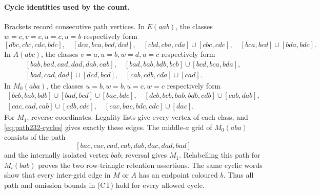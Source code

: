 \paragraph{Cycle identities used by the count.}
Brackets record consecutive path vertices. In $E(aab)$, the classes
$w=c,v=c,u=c,u=b$ respectively form
\[
[dbc,cbc,cdc,bdc],\quad[dca,bca,bcd,dcd],\quad
[cbd,cba,cda]\cup[cbc,cdc],\quad[bca,bcd]\cup[bda,bdc].
\]
In $A(abc)$, the classes $v=a,u=b,w=d,u=c$ respectively form
\[
\begin{gathered}
[bab,bad,cad,dad,dab,cab],\quad
[bad,bab,bdb,bcb]\cup[bcd,bca,bda],\\
[bad,cad,dad]\cup[dcd,bcd],\quad[cab,cdb,cda]\cup[cad].
\end{gathered}
\]
In $M_0(aba)$, the classes $u=b,w=b,u=c,w=c$ respectively form
\[
\begin{gathered}
[bcb,bab,bdb]\cup[bad,bcd]\cup[bac,bdc],\quad
[dcb,bcb,bab,bdb,cdb]\cup[cab,dab],\\
[cac,cad,cab]\cup[cdb,cdc],\quad
[cac,bac,bdc,cdc]\cup[dac].
\end{gathered}
\]
For $M_1$, reverse coordinates. Legality lists give every vertex of
each class, and \eqref{eq:path232-cycles} gives exactly these edges.
The middle-$a$ grid of $M_0(aba)$ consists of the path
\[
[bac,cac,cad,cab,dab,dac,dad,bad]
\]
and the internally isolated vertex $bab$; reversal gives $M_1$.
Relabelling this path for $M_i(bab)$ proves the two row-triangle
retention assertions. The same cyclic words show that every inter-grid
edge in $M$ or $A$ has an endpoint coloured $b$. Thus all path and
omission bounds in (CT) hold for every allowed cycle.

